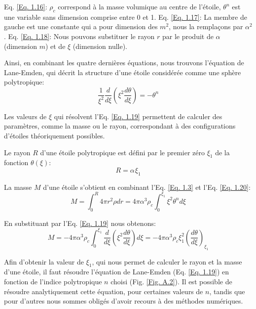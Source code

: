 Eq. \ref{Eq. 1.16}: $\rho_{c}$ correspond à la masse volumique au centre de l'étoile, $\theta^{n}$ est une variable sans dimension
comprise entre 0 et 1.\smallskip\newline
Eq. \ref{Eq. 1.17}: La membre de gauche est une constante qui a pour dimension des $m^{2}$, nous la remplaçons par $\alpha^{2}$.\smallskip\newline
Eq. \ref{Eq. 1.18}: Nous pouvons substituer le rayon $r$ par le produit de $\alpha$ (dimension $m$) et de $\xi$ (dimension nulle).\bigskip

Ainsi, en combinant les quatre dernières équations, nous trouvons l'équation de Lane-Emden\footnotemark[5], qui décrit la structure d'une étoile considérée comme une sphère polytropique:\begin{equation}\boxed{\dfrac{1}{\xi^{2}}\dfrac{d}{d\xi}\left( \xi^{2}\dfrac{d\theta}{d\xi}\right) =-\theta^{n}}\label{Eq. 1.19}\end{equation}

Les valeurs de $\xi$ qui résolvent l'Eq. \ref{Eq. 1.19} permettent de calculer des paramètres, comme la masse ou le rayon\footnotemark[6], correspondant à des configurations d'étoiles théoriquement possibles.\smallskip 

Le rayon $R$ d'une étoile polytropique est défini par le premier zéro $\xi_{1}$ de la fonction $\theta(\xi)$\footnotemark[7]:\begin{equation}R=\alpha\hspace{1pt}\xi_{1}\label{Eq. 1.20}\end{equation}

La masse $M$ d'une étoile s'obtient en combinant l'Eq. \ref{Eq. 1.3} et l'Eq. \ref{Eq. 1.20}:\begin{equation}M=\int_{0}^{R}4\pi r^{2}\rho dr=4\pi \alpha^{3} \rho_{c}\int_{0}^{\xi_{1}}\xi^{2}\theta^{n}d\xi\label{Eq. 1.21}\end{equation}

En substituant par l'Eq. \ref{Eq. 1.19} nous obtenons:\begin{equation}M=-4\pi \alpha^{3}\rho_{c}\int_{0}^{\xi_{1}}\dfrac{d}{d\xi}\left(\xi^2\dfrac{d\theta}{d\xi}\right)d\xi=-4\pi \alpha^{3}\rho_{c}\xi^{2}_{1}\left( \dfrac{d\theta}{d\xi}\right)_{\xi_{1}}\label{Eq. 1.22}\end{equation}\bigskip

Afin d'obtenir la valeur de $\xi_{1}$, qui nous permet de calculer le rayon et la masse d'une étoile, il faut résoudre l'équation de Lane-Emden (Eq. \ref{Eq. 1.19}) en fonction de l'indice polytropique $n$ choisi (Fig. \ref{Fig. A.2}). Il est possible de résoudre analytiquement cette équation, pour certaines valeurs de $n$, tandis que pour d'autres nous sommes obligés d'avoir recours à des méthodes numériques.\smallskip 

